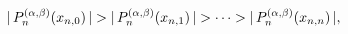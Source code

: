 \[|\mathop{P^{(\alpha,\beta)}_{n}\/}\nolimits\!\left(x_{n,0}\right)|>|\mathop{P^%
{(\alpha,\beta)}_{n}\/}\nolimits\!\left(x_{n,1}\right)|>\cdots>|\mathop{P^{(%
\alpha,\beta)}_{n}\/}\nolimits\!\left(x_{n,n}\right)|,\]